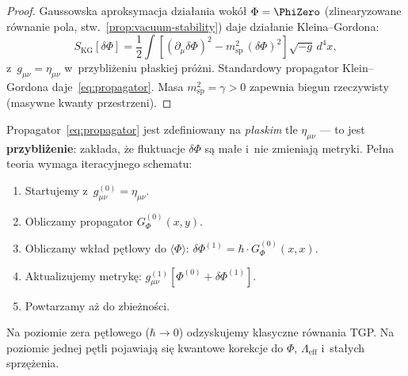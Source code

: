 \begin{proof}
Gaussowska aproksymacja działania wokół $\Phi = \PhiZero$
(zlinearyzowane równanie pola, stw.~\ref{prop:vacuum-stability})
daje działanie Kleina--Gordona:
\begin{equation}
    S_{\mathrm{KG}}[\delta\Phi]
    = \frac{1}{2}\int\!\left[
        (\partial_\mu\delta\Phi)^2
        - m_{\mathrm{sp}}^2\,(\delta\Phi)^2
    \right]\sqrt{-g}\,d^4x,
\end{equation}
z~$g_{\mu\nu} = \eta_{\mu\nu}$ w~przybliżeniu płaskiej próżni.
Standardowy propagator Klein--Gordona daje~\eqref{eq:propagator}.
Masa $m_{\mathrm{sp}}^2 = \gamma > 0$ zapewnia biegun rzeczywisty
(masywne kwanty przestrzeni).
\end{proof}

\begin{remark}\label{rem:self-ref-prop}
Propagator~\eqref{eq:propagator} jest zdefiniowany na \emph{płaskim}
tle $\eta_{\mu\nu}$ --- to jest \textbf{przybliżenie}: zakłada,
że fluktuacje $\delta\Phi$ są małe i~nie zmieniają metryki.
Pełna teoria wymaga iteracyjnego schematu:
\begin{enumerate}[nosep]
    \item Startujemy z~$g_{\mu\nu}^{(0)} = \eta_{\mu\nu}$.
    \item Obliczamy propagator $G_\Phi^{(0)}(x,y)$.
    \item Obliczamy wkład pętlowy do $\langle\Phi\rangle$:
          $\delta\Phi^{(1)} = \hbar \cdot G_\Phi^{(0)}(x,x)$.
    \item Aktualizujemy metrykę: $g^{(1)}_{\mu\nu}[\Phi^{(0)}
          + \delta\Phi^{(1)}]$.
    \item Powtarzamy aż do zbieżności.
\end{enumerate}
Na poziomie zera pętlowego ($\hbar \to 0$) odzyskujemy klasyczne
równania TGP. Na poziomie jednej pętli pojawiają się kwantowe
korekcje do $\Phi$, $\Lambda_{\mathrm{eff}}$ i~stałych sprzężenia.
\end{remark}

